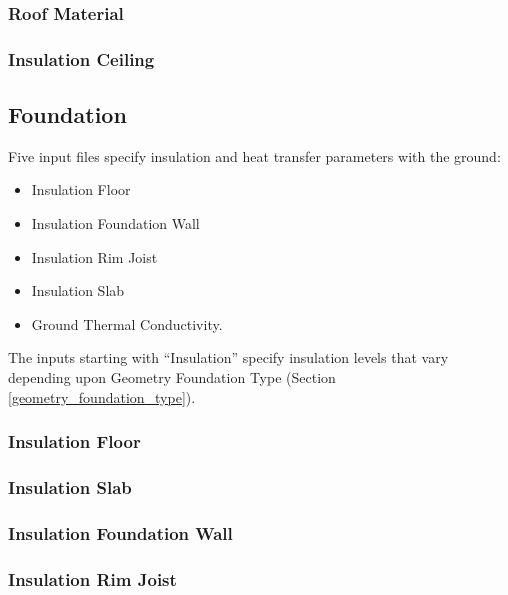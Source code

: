 \subsubsection{Roof Material}\label{roof_material}


\subsubsection{Insulation Ceiling}\label{insulation_ceiling}


\subsection{Foundation}
Five input files specify insulation and heat transfer parameters with the ground:
\begin{itemize}
    \item Insulation Floor
    \item Insulation Foundation Wall
    \item Insulation Rim Joist
    \item Insulation Slab
    \item Ground Thermal Conductivity.
\end{itemize}

The inputs starting with ``Insulation'' specify insulation levels that vary depending upon Geometry Foundation Type (Section \ref{geometry_foundation_type}).
\subsubsection{Insulation Floor}\label{insulation_floor}


\subsubsection{Insulation Slab}\label{insulation_slab}


\subsubsection{Insulation Foundation Wall}\label{insulation_foundation_wall}


\subsubsection{Insulation Rim Joist}\label{insulation_rim_joist}


